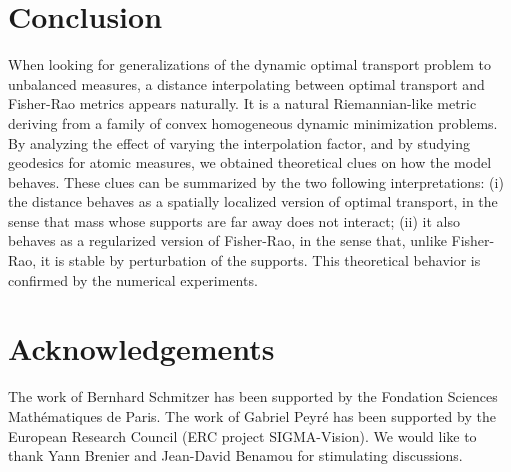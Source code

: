 
\section*{Conclusion}

When looking for generalizations of the dynamic optimal transport problem to unbalanced measures, a distance interpolating between optimal transport and Fisher-Rao metrics appears naturally. It is a natural Riemannian-like metric deriving from a family of convex homogeneous dynamic minimization problems. 
%
By analyzing the effect of varying the interpolation factor, and by studying geodesics for atomic measures, we obtained theoretical clues on how the model behaves.
These clues can be summarized by the two following interpretations: 
(i) the distance behaves as a spatially localized version of optimal transport, in the sense that mass whose supports are far away does not interact;
(ii) it also behaves as a regularized version of Fisher-Rao, in the sense that, unlike Fisher-Rao, it is stable by perturbation of the supports. This theoretical behavior is confirmed by the numerical experiments.




\section*{Acknowledgements}

The work of Bernhard Schmitzer has been supported by the Fondation Sciences Math\'ematiques de Paris. 
%
The work of Gabriel Peyr\'e has been supported by the European Research Council (ERC project SIGMA-Vision). 
%
We would like to thank Yann Brenier and Jean-David Benamou for stimulating discussions. 

